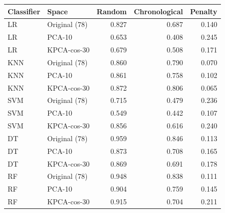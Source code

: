 \begin{tabular}{llrrr}
\toprule
Classifier & Space & Random & Chronological & Penalty \\
\midrule
LR & Original (78) & 0.827 & 0.687 & 0.140 \\
LR & PCA-10 & 0.653 & 0.408 & 0.245 \\
LR & KPCA-cos-30 & 0.679 & 0.508 & 0.171 \\
KNN & Original (78) & 0.860 & 0.790 & 0.070 \\
KNN & PCA-10 & 0.861 & 0.758 & 0.102 \\
KNN & KPCA-cos-30 & 0.872 & 0.806 & 0.065 \\
SVM & Original (78) & 0.715 & 0.479 & 0.236 \\
SVM & PCA-10 & 0.549 & 0.442 & 0.107 \\
SVM & KPCA-cos-30 & 0.856 & 0.616 & 0.240 \\
DT & Original (78) & 0.959 & 0.846 & 0.113 \\
DT & PCA-10 & 0.873 & 0.708 & 0.165 \\
DT & KPCA-cos-30 & 0.869 & 0.691 & 0.178 \\
RF & Original (78) & 0.948 & 0.838 & 0.111 \\
RF & PCA-10 & 0.904 & 0.759 & 0.145 \\
RF & KPCA-cos-30 & 0.915 & 0.704 & 0.211 \\
\bottomrule
\end{tabular}
